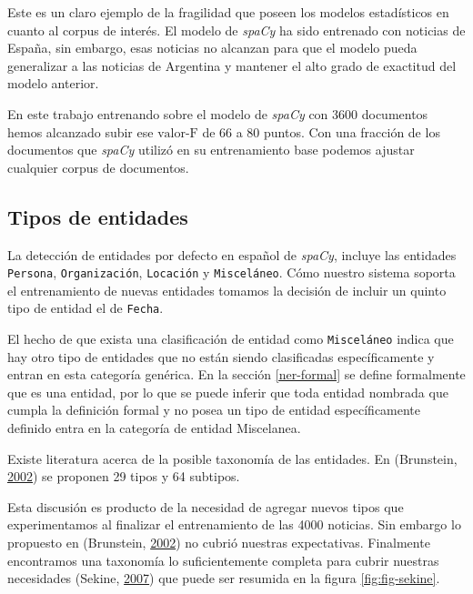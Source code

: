 \documentclass[12pt,a4paper,]{scrartcl}
\begin{document}
Este es un claro ejemplo de la fragilidad que poseen los modelos estadísticos en cuanto al corpus de interés. El modelo de \emph{spaCy} ha sido entrenado con noticias de España, sin embargo, esas noticias no alcanzan para que el modelo pueda generalizar a las noticias de Argentina y mantener el alto grado de exactitud del modelo anterior.

En este trabajo entrenando sobre el modelo de \emph{spaCy} con 3600 documentos hemos alcanzado subir ese \(\text{valor-F}\) de 66 a 80 puntos. Con una fracción de los documentos que \emph{spaCy} utilizó en su entrenamiento base podemos ajustar cualquier corpus de documentos.

\hypertarget{tipos-de-entidades}{%
\subsection{Tipos de entidades}\label{tipos-de-entidades}}

La detección de entidades por defecto en español de \emph{spaCy}, incluye las entidades \texttt{Persona}, \texttt{Organización}, \texttt{Locación} y \texttt{Misceláneo}. Cómo nuestro sistema soporta el entrenamiento de nuevas entidades tomamos la decisión de incluir un quinto tipo de entidad el de \texttt{Fecha}.

El hecho de que exista una clasificación de entidad como \texttt{Misceláneo} indica que hay otro tipo de entidades que no están siendo clasificadas específicamente y entran en esta categoría genérica. En la sección \ref{ner-formal} se define formalmente que es una entidad, por lo que se puede inferir que toda entidad nombrada que cumpla la definición formal y no posea un tipo de entidad específicamente definido entra en la categoría de entidad Miscelanea.

Existe literatura acerca de la posible taxonomía de las entidades. En (Brunstein, \protect\hyperlink{ref-brunstein2002}{2002}) se proponen 29 tipos y 64 subtipos.

Esta discusión es producto de la necesidad de agregar nuevos tipos que experimentamos al finalizar el entrenamiento de las 4000 noticias. Sin embargo lo propuesto en (Brunstein, \protect\hyperlink{ref-brunstein2002}{2002}) no cubrió nuestras expectativas. Finalmente encontramos una taxonomía lo suficientemente completa para cubrir nuestras necesidades (Sekine, \protect\hyperlink{ref-Sekine-NER}{2007}) que puede ser resumida en la figura \ref{fig:fig-sekine}.
\end{document}
